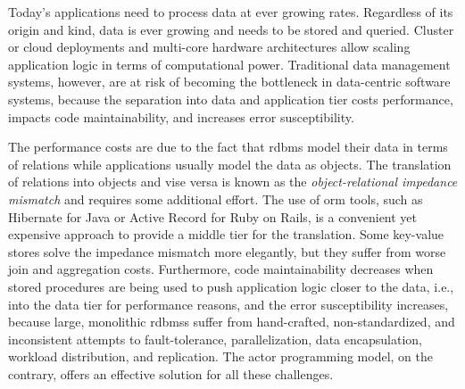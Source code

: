 
  Today's applications need to process data at ever growing rates.
  Regardless of its origin and kind, data is ever growing and needs to be stored and queried.
  Cluster or cloud deployments and multi-core hardware architectures allow scaling application logic in terms of computational power.
  Traditional data management systems, however, are at risk of becoming the bottleneck in data-centric software systems, because the separation into data and application tier costs performance, impacts code maintainability, and increases error susceptibility.

  The performance costs are due to the fact that \gls{rdbms} model their data in terms of relations while applications usually model the data as objects.
  The translation of relations into objects and vise versa is known as the \emph{object-relational impedance mismatch} and requires some additional effort.
  The use of \gls{orm} tools, such as Hibernate for Java or Active Record for Ruby on Rails, is a convenient yet expensive approach to provide a middle tier for the translation. Some key-value stores solve the impedance mismatch more elegantly, but they suffer from worse join and aggregation costs. Furthermore, code maintainability decreases when stored procedures are being used to push application logic closer to the data, {i.e.}, into the data tier for performance reasons, and the error susceptibility increases, because large, monolithic \glspl{rdbms} suffer from hand-crafted, non-standardized, and inconsistent attempts to fault-tolerance, parallelization, data encapsulation, workload distribution, and replication.
  The actor programming model, on the contrary, offers an effective solution for all these challenges.

